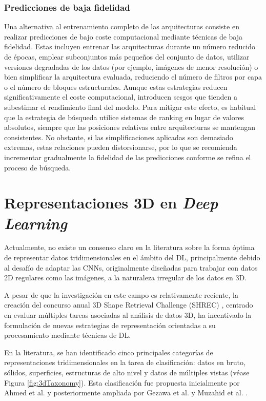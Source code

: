 \subsubsection{Predicciones de baja fidelidad}
Una alternativa al entrenamiento completo de las arquitecturas consiste en realizar predicciones de bajo coste computacional mediante técnicas de baja fidelidad. Estas incluyen entrenar las arquitecturas durante un número reducido de épocas, emplear subconjuntos más pequeños del conjunto de datos, utilizar versiones degradadas de los datos (por ejemplo, imágenes de menor resolución) o bien simplificar la arquitectura evaluada, reduciendo el número de filtros por capa o el número de bloques estructurales. Aunque estas estrategias reducen significativamente el coste computacional, introducen sesgos que tienden a subestimar el rendimiento final del modelo. Para mitigar este efecto, es habitual que la estrategia de búsqueda utilice sistemas de ranking en lugar de valores absolutos, siempre que las posiciones relativas entre arquitecturas se mantengan consistentes. No obstante, si las simplificaciones aplicadas son demasiado extremas, estas relaciones pueden distorsionarse, por lo que se recomienda incrementar gradualmente la fidelidad de las predicciones conforme se refina el proceso de búsqueda.

\section{Representaciones 3D en \textit{Deep Learning}}
\label{section2:3dreps}
Actualmente, no existe un consenso claro en la literatura sobre la forma óptima de representar datos tridimensionales en el ámbito del DL, principalmente debido al desafío de adaptar las CNNs, originalmente diseñadas para trabajar con datos 2D regulares como las imágenes, a la naturaleza irregular de los datos en 3D.

A pesar de que la investigación en este campo es relativamente reciente, la creación del concurso anual 3D Shape Retrieval Challenge (SHREC) \cite{noauthor_shrec_nodate, noauthor_3dor2024_nodate}, centrado en evaluar múltiples tareas asociadas al análisis de datos 3D, ha incentivado la formulación de nuevas estrategias de representación orientadas a su procesamiento mediante técnicas de DL. 

En la literatura, se han identificado cinco principales categorías de representaciones tridimensionales en la tarea de clasificación: datos en bruto, sólidos, superficies, estructuras de alto nivel y datos de múltiples vistas (véase Figura \ref{fig:3dTaxonomy}). Esta clasificación fue propuesta inicialmente por Ahmed et al. \cite{ahmed_survey_2019} y posteriormente ampliada por Gezawa et al. \cite{gezawa_review_2020} y Muzahid et al. \cite{muzahid_deep_2024}.

